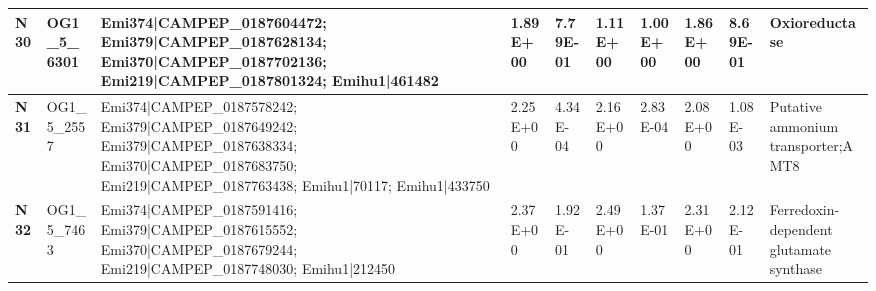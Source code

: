 \begin{landscape}
\begin{center}
\begin{footnotesize}
\begin{longtable}{|p{0.5cm}|p{1.5cm}|p{4cm}|l|l|l|l|l|l|l|}
\textbf{N30} & OG1\_5\_6301  & Emi374|CAMPEP\_0187604472; Emi379|CAMPEP\_0187628134; Emi370|CAMPEP\_0187702136; Emi219|CAMPEP\_0187801324; Emihu1|461482                                                                                                                                                                                                                                                                                                                                                                                                                                                                                                                & 1.89E+00  & 7.79E-01 & 1.11E+00  & 1.00E+00 & 1.86E+00  & 8.69E-01 & Oxioreductase                                                                \\ \hline
\textbf{N31} & OG1\_5\_2557  & Emi374|CAMPEP\_0187578242; Emi379|CAMPEP\_0187649242; Emi379|CAMPEP\_0187638334; Emi370|CAMPEP\_0187683750; Emi219|CAMPEP\_0187763438; Emihu1|70117; Emihu1|433750                                                                                                                                                                                                                                                                                                                                                                                                                                                                       & 2.25E+00  & 4.34E-04 & 2.16E+00  & 2.83E-04 & 2.08E+00  & 1.08E-03 & Putative ammonium transporter;AMT8                                           \\ \hline
\textbf{N32} & OG1\_5\_7463  & Emi374|CAMPEP\_0187591416; Emi379|CAMPEP\_0187615552; Emi370|CAMPEP\_0187679244; Emi219|CAMPEP\_0187748030; Emihu1|212450                                                                                                                                                                                                                                                                                                                                                                                                                                                                                                                & 2.37E+00  & 1.92E-01 & 2.49E+00  & 1.37E-01 & 2.31E+00  & 2.12E-01 & Ferredoxin-dependent glutamate synthase                                      \\ \hline

\end{longtable}
\end{footnotesize}
\end{center}
\end{landscape}
